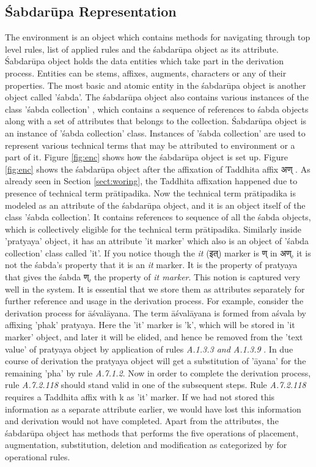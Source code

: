 \documentclass[a4paper,11pt,twoside,openright]{report}
\begin{document}
\subsection{ \uppercase{ś}abdarūpa Representation}
The environment is an object which contains methods for navigating through top level rules, list of applied rules and the śabdarūpa object as its attribute. \uppercase{ś}abdarūpa object holds the data entities which take part in the derivation process. Entities can be stems, affixes, augments, characters or any of their properties. The most basic and atomic entity in the śabdarūpa object is another object called 'śabda'. The śabdarūpa object also contains various instances of the class 'śabda collection' , which contains a sequence of references to śabda objects along with a set of attributes that belongs to the collection. \uppercase{ś}abdarūpa object is an instance of 'śabda collection' class.  Instances of 'śabda collection' are used to represent various technical terms that may be attributed to environment or a part of it. Figure \ref{fig:enc} shows how the śabdarūpa object is set up.  Figure \ref{fig:enc} shows the śabdarūpa object after the affixation of Taddhita affix {\skt अण् }. As already seen in Section \ref{sect:woring}, the Taddhita affixation happened due to presence of technical term prātipadika. Now the technical term prātipadika is modeled as an attribute of the śabdarūpa object, and it is an object itself of the class 'śabda collection'. It contains references to sequence of all the śabda objects, which is collectively eligible for the technical term prātipadika. Similarly inside 'pratyaya' object, it has an attribute 'it marker' which also is an object  of 'śabda collection' class called 'it'. If you notice though the \textsl{ it} ({\skt इत्}) marker is {\skt ण् in अण्}, it is not the śabda's property that it is an \textsl{ it} marker. It is the property of pratyaya that gives the śabda {\skt ण्}, the property of \textsl{ it marker}. This notion is captured very well in the system. It is essential that we store them as attributes separately for further reference and usage in the derivation process. For example, consider the derivation process for āśvalāyana. The term āśvalāyana is formed from aśvala by affixing 'phak' pratyaya. Here the 'it' marker is 'k', which will be stored in 'it marker' object, and later it will be elided, and hence be removed from the 'text value' of pratyaya object by application of rules \textsl{ A.1.3.3 and A.1.3.9} . In due course of derivation the pratyaya object will get a substitution of 'āyana' for the remaining 'pha' by rule \textsl{ A.7.1.2}. Now in order to complete the derivation process, rule \textsl{ A.7.2.118} should stand valid in one of the subsequent steps. Rule\textsl{ A.7.2.118} requires a Taddhita affix with k as 'it' marker. If we had not stored this information as a separate attribute earlier, we would have lost this information and derivation would not have completed. Apart from the attributes, the śabdarūpa object has methods that performs the five operations of placement, augmentation, substitution, deletion and modification  as categorized by  for operational rules.
\end{document}
